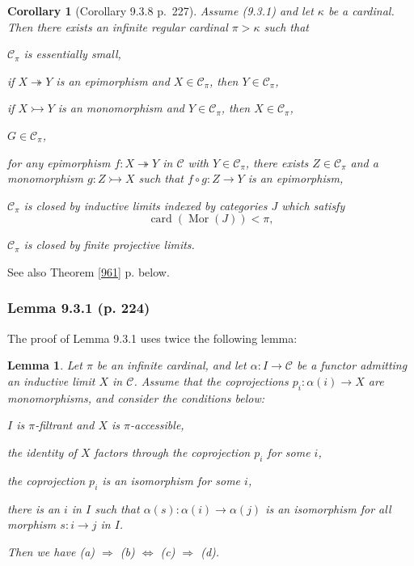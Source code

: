 \documentclass[12pt]{article}%
\newtheorem{lem}[thm]{Lemma}
\newtheorem{cor}[thm]{Corollary}
\theoremstyle{remark}
\theoremstyle{definition}
\newcommand{\nn}{\noindent}
\newcommand{\C}{\mathcal C}
\newcommand{\epi}{\twoheadrightarrow}
\newcommand{\mono}{\rightarrowtail}%
\newcommand{\then}{\Rightarrow}
\newcommand{\ssi}{\Leftrightarrow}%
\DeclareMathOperator{\card}{card}%
\DeclareMathOperator{\Mor}{Mor}
\begin{document}
\begin{cor}[Corollary 9.3.8 p.~227]\label{938}
Assume (9.3.1) and let $\kappa$ be a cardinal. Then there exists an infinite regular cardinal $\pi>\kappa$ such that 

\nn{\em(i)} $\C_\pi$ is essentially small,

\nn{\em(ii)} if $X\epi Y$ is an epimorphism and $X\in\C_\pi$, then $Y\in\C_\pi$,

\nn{\em(iii)} if $X\mono Y$ is an monomorphism and $Y\in\C_\pi$, then $X\in\C_\pi$,

\nn{\em(iv)} $G\in\C_\pi$,

\nn{\em(v)} for any epimorphism $f:X\epi Y$ in $\C$ with $Y\in\C_\pi$, there exists $Z\in\C_\pi$ and a monomorphism $g:Z\mono X$ such that $f\circ g:Z\to Y$ is an epimorphism,

\nn{\em(vi)} $\C_\pi$ is closed by inductive limits indexed by categories $J$ which satisfy $$\card(\Mor(J))<\pi,$$

\nn{\em(vii)} $\C_\pi$ is closed by finite projective limits.
\end{cor}

See also Theorem \ref{961} p. \pageref{961} below.

%

\subsubsection{Lemma 9.3.1 (p. 224)}

The proof of Lemma 9.3.1 uses twice the following lemma:

\begin{lem}\label{ppi}
Let $\pi$ be an infinite cardinal, and let $\alpha:I\to\C$ be a functor admitting an inductive limit $X$ in $\C$. Assume that the coprojections $p_i:\alpha(i)\to X$ are monomorphisms, and consider the conditions below:

\nn{\em(a)} $I$ is $\pi$-filtrant and $X$ is $\pi$-accessible,

\nn{\em(b)} the identity of $X$ factors through the coprojection $p_i$ for some $i$,

\nn{\em(c)} the coprojection $p_i$ is an isomorphism for some $i$,

\nn{\em(d)} there is an $i$ in $I$ such that $\alpha(s):\alpha(i)\to\alpha(j)$ is an isomorphism for all morphism $s:i\to j$ in $I$.

\nn Then we have {\em(a)} $\then$ {\em(b)} $\ssi$ {\em(c)} $\then$ {\em(d)}. 
\end{lem}
\end{document}
